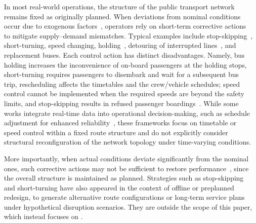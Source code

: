 \documentclass[a4paper,fleqn]{cas-sc}
\begin{document}
In most real-world operations, the structure of the public transport network remains fixed as originally planned. 
When deviations from nominal conditions occur due to exogenous factors~\citep{nissen2020does, chen2009analyzing}, 
operators rely on short-term corrective actions to mitigate supply--demand mismatches.
Typical examples include stop-skipping~\citep{peled2021quality}, short-turning, 
speed changing, holding~\citep{tang2018optimal, manasra2019optimization, gkiotsalitis2020public, olvera2023holding}, 
detouring of interrupted lines~\citep{zheng2023multi}, and replacement buses.
Each control action has distinct disadvantages.
Namely, bus holding increases the inconvenience of on-board passengers at the holding stops, short-turning requires passengers to disembark and wait for a subsequent bus trip, rescheduling affects the timetables and the crew/vehicle schedules; speed control cannot be implemented when the required speeds are beyond the safety limits, and stop-skipping results in refused passenger boardings~\citep{gkiotsalitis2021stop}.
While some works integrate real-time data into operational decision-making, such as schedule adjustment for enhanced reliability~\citep{cao2019real}, these frameworks focus on timetable or speed control within a fixed route structure and do not explicitly consider structural reconfiguration of the network topology under time-varying conditions.

More importantly, when actual conditions deviate significantly from the nominal ones, such corrective actions may not be sufficient to restore performance~\citep{guo2024restoring}, since the overall structure is maintained as planned.
%
Strategies such as stop-skipping and short-turning have also appeared in the context of offline or preplanned redesign, to generate alternative route configurations or long-term service plans under hypothetical disruption scenarios. They are outside the scope of this paper, which instead focuses on .
\end{document}
